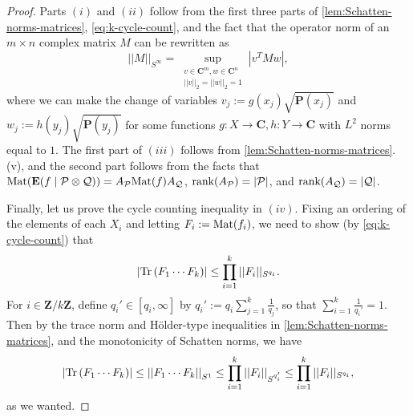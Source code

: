 \documentclass[reqno,11pt]{amsart}
\theoremstyle{definition}
\theoremstyle{remark}
\numberwithin{equation}{section}
\newcommand{\Z}{\mathbf{Z}}
\newcommand{\C}{\mathbf{C}}
\renewcommand{\P}{\mathbf{P}}
\newcommand{\E}{\mathbf{E}}
\newcommand{\mP}{\mathcal{P}}
\newcommand{\mQ}{\mathcal{Q}}
\newcommand{\Tr}{\textnormal{Tr}}
\newcommand{\Mat}{\textnormal{Mat}}
\newcommand{\rank}{\textnormal{rank}}
\begin{document}
\begin{proof}
Parts $(i)$ and $(ii)$ follow from the first three parts of \cref{lem:Schatten-norms-matrices}, \cref{eq:k-cycle-count}, and the fact that the operator norm of an $m \times n$ complex matrix $M$ can be rewritten as
\[
    ||M||_{S^\infty} = \sup_{\substack{v \in \C^m, w \in \C^n \\ ||v||_2 = ||w||_2 = 1}} |v^T M w|,
\]
where we can make the change of variables $v_j := g(x_j) \sqrt{\P(x_j)}$ and $w_j := h(y_j) \sqrt{\P(y_j)}$ for some functions $g : X \to \C, h : Y \to \C$ with $L^2$ norms equal to $1$. The first part of $(iii)$ follows from \cref{lem:Schatten-norms-matrices}.(v), and the second part follows from the facts that $\Mat(\E(f \mid \mP \otimes \mQ)) = A_\mP \Mat(f) A_\mQ$, $\rank(A_\mP) = |\mP|$, and $\rank(A_\mQ) = |\mQ|$.

Finally, let us prove the cycle counting inequality in $(iv)$. Fixing an ordering of the elements of each $X_i$ and letting $F_{i} := \Mat(f_{i})$, we need to show (by \cref{eq:k-cycle-count}) that 
\[
    \left\vert \Tr\left( F_1 \cdots F_k \right)\right\vert \le \prod_{i=1}^k ||F_i||_{S^{q_i}}.
\]
For $i \in \Z/k\Z$, define $q_i' \in [q_i, \infty]$ by $q_i' := q_i \sum_{j=1}^k \frac{1}{q_j}$, so that $\sum_{i=1}^k \frac{1}{q_i'} = 1$. Then by the trace norm and H\"older-type inequalities in \cref{lem:Schatten-norms-matrices}, and the monotonicity of Schatten norms, we have
\[
    \left\vert \Tr\left( F_1 \cdots F_k \right)\right\vert \le \left\vert \left\vert F_1 \cdots F_k \right\vert\right\vert_{S^1} 
    \le 
    \prod_{i=1}^k ||F_i||_{S^{q_i'}} \le 
    \prod_{i=1}^k ||F_i||_{S^{q_i}},
\]
as we wanted.
\end{proof}
\end{document}
